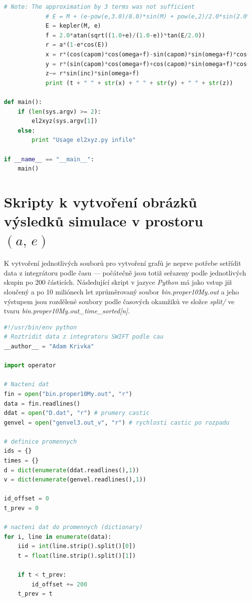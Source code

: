 \documentclass[A4paper, 12pt, oneside]{book}
\begin{document}
\begin{appendices}
\begin{lstlisting}[language=Python]
            # Note: The approximation by 3 terms was not sufficient
            # E = M + (e-pow(e,3.0)/8.0)*sin(M) + pow(e,2)/2.0*sin(2.0*M) + pow(e,3)*3.0/8.0*sin(3.0*M)
            E = kepler(M, e)
            f = 2.0*atan(sqrt((1.0+e)/(1.0-e))*tan(E/2.0))
            r = a*(1-e*cos(E))
            x = r*(cos(capom)*cos(omega+f)-sin(capom)*sin(omega+f)*cos(inc))
            y = r*(sin(capom)*cos(omega+f)+cos(capom)*sin(omega+f)*cos(inc))
            z~= r*sin(inc)*sin(omega+f)
            print (t + " " + str(x) + " " + str(y) + " " + str(z))

def main():
    if (len(sys.argv) >= 2):
        el2xyz(sys.argv[1])
    else:
        print "Usage el2xyz.py infile"

if __name__ == "__main__":
    main()
	\end{lstlisting}

	\chapter{Skripty k vytvoření obrázků výsledků simulace v prostoru $(a,\,e)$} \label{app:fig:ae_sim}
	K vytvoření jednotlivých souborů pro vytvoření grafů je neprve potřebe setřídit data z integrátoru podle času --- počátečně jsou totiž seřazeny podle jednotlivých skupin po 200 částicích. Následující skript v jazyce \textit{Python} má jako vstup již sloučený a po 10 miliónech let zprůměrovaný soubor \textit{bin.proper10My.out} a jeho výstupem jsou rozdělené soubory podle časových okamžiků ve složce \textit{split/} ve tvaru \textit{bin.proper10My.out\_time\_sorted[n]}.
	\begin{lstlisting}[language=Python]
#!/usr/bin/env python
# Roztridit data z integratoru SWIFT podle cau
__author__ = "Adam Krivka"

import operator

# Nacteni dat
fin = open("bin.proper10My.out", "r")
data = fin.readlines()
ddat = open("D.dat", "r") # prumery castic
genvel = open("genvel3.out_v", "r") # rychlosti castic po rozpadu

# definice promennych
ids = {}
times = {}
d = dict(enumerate(ddat.readlines(),1))
v = dict(enumerate(genvel.readlines(),1))

id_offset = 0
t_prev = 0

# nacteni dat do promennych (dictionary)
for i, line in enumerate(data):
    iid = int(line.strip().split()[0])
    t = float(line.strip().split()[1])

    if t < t_prev:
        id_offset += 200
    t_prev = t


\end{lstlisting}
\end{appendices}
\end{document}
